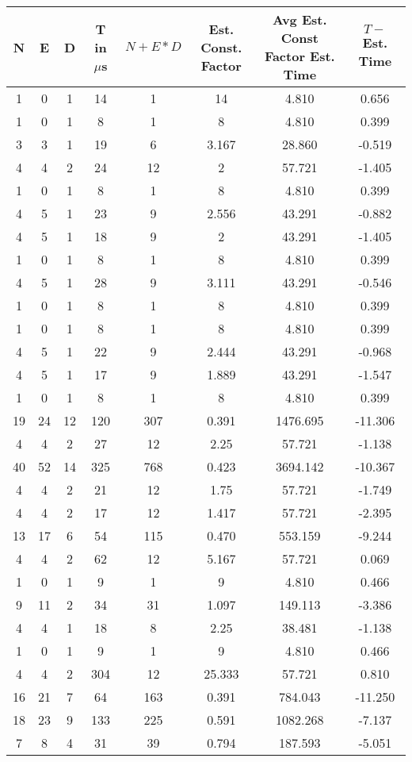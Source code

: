 \documentclass{article}
\begin{document}
\begin{center}
\begin{tabular}{||c|c|c|c|c|c|c|c||} \hline
N & E & D & T in $\mu$s & $N+E*D$ & Est. Const. Factor & Avg Est. Const Factor Est. Time & $T -$ Est. Time \\ \hline \hline
1 & 0 & 1 & 14 & 1 & 14 & 4.810 & 0.656 \\ \hline
1 & 0 & 1 & 8  & 1 & 8 & 4.810 & 0.399 \\ \hline
3 & 3 & 1 & 19 & 6 & 3.167 & 28.860 & -0.519 \\ \hline
4 & 4 & 2 & 24 & 12 & 2 & 57.721 & -1.405 \\ \hline
1 & 0 & 1 & 8 & 1 & 8 & 4.810 & 0.399 \\ \hline

4 & 5 & 1 & 23 & 9 & 2.556 & 43.291 & -0.882 \\ \hline
4 & 5 & 1 & 18 & 9 & 2 & 43.291 & -1.405 \\ \hline
1 & 0 & 1 & 8 & 1 & 8 & 4.810 & 0.399 \\ \hline
4 & 5 & 1 & 28 & 9 & 3.111 & 43.291 & -0.546 \\ \hline
1 & 0 & 1 & 8 & 1 & 8 & 4.810 & 0.399 \\ \hline

1 & 0 & 1 & 8 & 1 & 8 & 4.810 & 0.399 \\ \hline
4 & 5 & 1 & 22 & 9 & 2.444 & 43.291 & -0.968 \\ \hline
4 & 5 & 1 & 17 & 9 & 1.889 & 43.291 & -1.547 \\ \hline
1 & 0 & 1 & 8 & 1 & 8 & 4.810 & 0.399 \\ \hline
19 & 24 & 12 & 120 & 307 & 0.391 & 1476.695 & -11.306 \\ \hline

4 & 4 & 2 & 27 & 12 & 2.25 & 57.721 & -1.138 \\ \hline
40 & 52 & 14 & 325 & 768 & 0.423 & 3694.142 & -10.367 \\ \hline
4 & 4 & 2 & 21 & 12 & 1.75 & 57.721 & -1.749 \\ \hline
4 & 4 & 2 & 17 & 12 & 1.417 & 57.721 & -2.395 \\ \hline
13 & 17 & 6 & 54 & 115 & 0.470 & 553.159 & -9.244 \\ \hline

4 & 4 & 2 & 62 & 12 & 5.167 & 57.721 & 0.069 \\ \hline
1 & 0 & 1 & 9 & 1 & 9 & 4.810 & 0.466 \\ \hline
9 & 11 & 2 & 34 & 31 & 1.097 & 149.113 & -3.386 \\ \hline
4 & 4 & 1 & 18 & 8 & 2.25 & 38.481 & -1.138 \\ \hline
1 & 0 & 1 & 9 & 1 & 9 & 4.810 & 0.466 \\ \hline

4 & 4 & 2 & 304 & 12 & 25.333 & 57.721 & 0.810 \\ \hline
16 & 21 & 7 & 64 & 163 & 0.391 & 784.043 & -11.250 \\ \hline
18 & 23 & 9 & 133 & 225 & 0.591 & 1082.268 & -7.137 \\ \hline
7 & 8 & 4 & 31 & 39 & 0.794 & 187.593 & -5.051 \\ \hline

\end{tabular}
\end{center}
\end{document}
